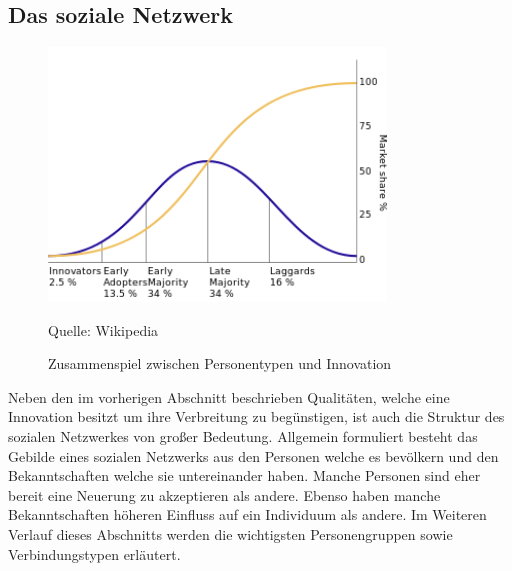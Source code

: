 \documentclass[12pt]{article}
\begin{document}
\subsection{Das soziale Netzwerk}

\begin{figure}
  \begin{center}
    \includegraphics[width=0.80\textwidth]{pic_diffusion.png}
      \caption{Zusammenspiel zwischen Personentypen und Innovation} 
  Quelle: Wikipedia
  \end{center}
  \label{pic_diffusion}
\end{figure}

Neben den im vorherigen Abschnitt beschrieben Qualitäten, welche eine Innovation besitzt um ihre Verbreitung zu begünstigen, ist auch die Struktur des sozialen Netzwerkes von großer Bedeutung. Allgemein formuliert besteht das Gebilde eines sozialen Netzwerks aus den Personen welche es bevölkern und den Bekanntschaften welche sie untereinander haben. Manche Personen sind eher bereit eine Neuerung zu akzeptieren als andere. Ebenso haben manche Bekanntschaften höheren Einfluss auf ein Individuum als andere. Im Weiteren Verlauf dieses Abschnitts werden die wichtigsten Personengruppen sowie Verbindungstypen erläutert.
\end{document}
